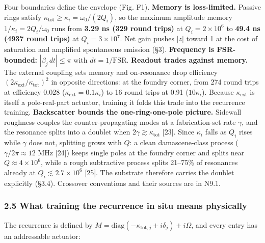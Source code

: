 \documentclass[
  10pt,
]{article}
\begin{document}
Four boundaries define the envelope (Fig. F1). \textbf{Memory is
loss-limited.} Passive rings satisfy
\(\kappa_\mathrm{tot} \geq \kappa_i = \omega_0/(2Q_i)\), so the maximum
amplitude memory \(1/\kappa_i = 2Q_i/\omega_0\) runs from \textbf{3.29
ns (329 round trips)} at \(Q_i = 2\times10^6\) to \textbf{49.4 ns (4937
round trips)} at \(Q_i = 3\times10^7\). Net gain pushes \(|z|\) toward 1
at the cost of saturation and amplified spontaneous emission (§3).
\textbf{Frequency is FSR-bounded:} \(|\beta_j\,dt| \leq \pi\) with
\(dt = 1/\mathrm{FSR}\). \textbf{Readout trades against memory.} The
external coupling sets memory and on-resonance drop efficiency
\((2\kappa_\mathrm{ext}/\kappa_\mathrm{tot})^2\) in opposite directions:
at the foundry corner, from 274 round trips at efficiency 0.028
(\(\kappa_\mathrm{ext} = 0.1\kappa_i\)) to 16 round trips at 0.91
(\(10\kappa_i\)). Because \(\kappa_\mathrm{ext}\) is itself a
pole-real-part actuator, training it folds this trade into the
recurrence training. \textbf{Backscatter bounds the one-ring-one-pole
picture.} Sidewall roughness couples the counter-propagating modes at a
fabrication-set rate \(\gamma\), and the resonance splits into a doublet
when \(2\gamma \gtrsim \kappa_\mathrm{tot}\) {[}23{]}. Since
\(\kappa_i\) falls as \(Q_i\) rises while \(\gamma\) does not, splitting
grows with \(Q\): a clean damascene-class process
(\(\gamma/2\pi \approx 12\) MHz {[}24{]}) keeps single poles at the
foundry corner and splits near \(Q \approx 4\times10^6\), while a rough
subtractive process splits 21--75\% of resonances already at
\(Q_i \lesssim 2.7\times10^6\) {[}25{]}. The substrate therefore carries
the doublet explicitly (§3.4). Crossover conventions and their sources
are in N9.1.

\subsubsection{2.5 What training the recurrence in situ means
physically}\label{what-training-the-recurrence-in-situ-means-physically}

The recurrence is defined by
\(M = \mathrm{diag}(-\kappa_{\mathrm{tot},j} + i\delta_j) + i\Omega\),
and every entry has an addressable actuator:
\end{document}
